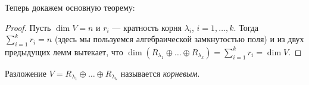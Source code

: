 Теперь докажем основную теорему:

\begin{proof}
    Пусть $\dim V = n$ и $r_i$ --- кратность корня $\lambda_i$, $i = 1, \ldots, k$. Тогда $\sum\limits_{i = 1}^kr_i = n$ (здесь мы пользуемся алгебраической замкнутостью поля) и из двух предыдущих лемм вытекает, что $\dim(R_{\lambda_1} \oplus \ldots \oplus R_{\lambda_k}) = \sum\limits_{i = 1}^kr_i = \dim V$.
\end{proof}

\begin{definition}
    Разложение $V = R_{\lambda_1} \oplus \ldots \oplus R_{\lambda_k}$ называется \textit{корневым}.
\end{definition}

